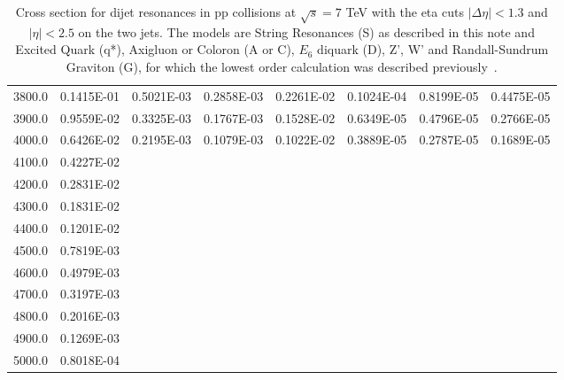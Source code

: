 \begin{table}[tbh]
\begin{center}
{\begin{tabular}{|r|l|l|l|l|l|l|l|}
  3800.0 & 0.1415E-01 & 0.5021E-03 & 0.2858E-03 & 0.2261E-02 & 0.1024E-04 & 0.8199E-05 & 0.4475E-05 \\
  3900.0 & 0.9559E-02 & 0.3325E-03 & 0.1767E-03 & 0.1528E-02 & 0.6349E-05 & 0.4796E-05 & 0.2766E-05 \\
  4000.0 & 0.6426E-02 & 0.2195E-03 & 0.1079E-03 & 0.1022E-02 & 0.3889E-05 & 0.2787E-05 & 0.1689E-05 \\
  4100.0 & 0.4227E-02 &            &            &            &            &            &            \\
  4200.0 & 0.2831E-02 &            &            &            &            &            &            \\
  4300.0 & 0.1831E-02 &            &            &            &            &            &            \\
  4400.0 & 0.1201E-02 &            &            &            &            &            &            \\
  4500.0 & 0.7819E-03 &            &            &            &            &            &            \\
  4600.0 & 0.4979E-03 &            &            &            &            &            &            \\
  4700.0 & 0.3197E-03 &            &            &            &            &            &            \\
  4800.0 & 0.2016E-03 &            &            &            &            &            &            \\
  4900.0 & 0.1269E-03 &            &            &            &            &            &            \\
  5000.0 & 0.8018E-04 &            &            &            &            &            &            \\
 \hline
\end{tabular}  
} 
\end{center}
\caption{Cross section for dijet resonances in pp collisions at $\sqrt{s}=7$ TeV with the eta cuts
 $|\Delta\eta|<1.3$ and $|\eta|<2.5$ on the two jets. The models are String Resonances (S) as described in 
 this note and Excited Quark (q*), Axigluon or Coloron (A or C), $E_6$ diquark (D), Z', W' and Randall-Sundrum
Graviton (G), for which the lowest order calculation was described previously~\cite{CMS_AN_2006-070}.}
\label{tabXsec}
\end{table}
\clearpage
